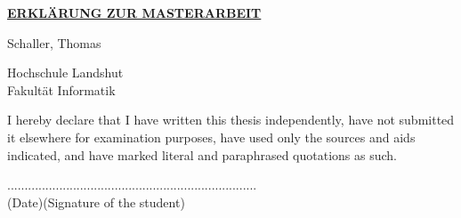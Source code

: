 \thispagestyle{empty}
\vspace{15mm}
\begin{center}
    \textbf{\underline{ERKLÄRUNG ZUR MASTERARBEIT}}
\end{center}
\vspace{25mm}
\begin{center}
    \large
    \large
    Schaller, Thomas
\end{center}
\vspace{25mm}

\begin{center}
    \huge
    Hochschule Landshut \\
    Fakultät Informatik
\end{center}
\vspace{10mm}

\begin{center}
    \large
    I hereby declare that I have written this thesis independently,
    have not submitted it elsewhere for examination purposes,
    have used only the sources and aids indicated, and have marked
    literal and paraphrased quotations as such. \\
\end{center}
\vspace{55mm}

\begin{center}
    ....................\hspace{40mm}....................................................\\

    (Date)\hspace{47mm}(Signature of the student)
\end{center}
